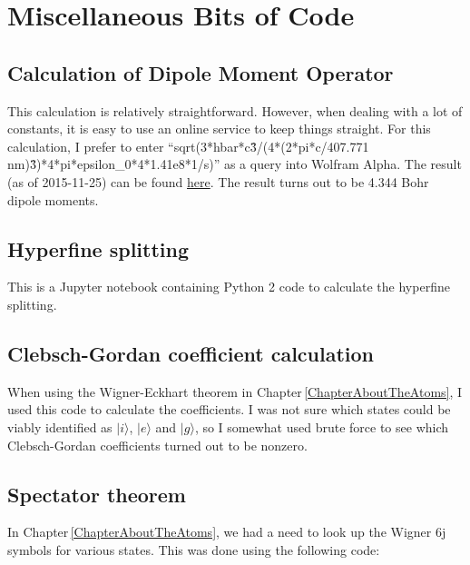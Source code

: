 \chapter{Miscellaneous Bits of Code}
\label{sympy6jAppendix}

\section{Calculation of Dipole Moment Operator}
This calculation is relatively straightforward. However, when dealing with a lot of constants, it is easy to use an online service to keep things straight. For this calculation, I prefer to enter ``sqrt(3*hbar*c\^3/(4*(2*pi*c/407.771 nm)\^3)*4*pi*epsilon\_0*4*1.41e8*1/s)'' as a query into Wolfram Alpha. The result (as of 2015-11-25) can be found 
\href{http://www.wolframalpha.com/input/?i=sqrt%283*hbar*c%5E3%2F%284*%282*pi*c%2F407.771+nm%29%5E3%29*4*pi*epsilon_0*4*1.41e8*1%2Fs%29}{here}.
The result turns out to be 4.344 Bohr dipole moments.
\section{Hyperfine splitting}
This is a Jupyter notebook containing Python 2 code to calculate the hyperfine splitting.

\section{Clebsch-Gordan coefficient calculation}
When using the Wigner-Eckhart theorem in Chapter\,\ref{ChapterAboutTheAtoms}, I used this code to calculate the coefficients. I was not sure which states could be viably identified as $|i\rangle$, $|e\rangle$ and $|g\rangle$, so I somewhat used brute force to see which Clebsch-Gordan coefficients turned out to be nonzero. 

\section{Spectator theorem}
In Chapter\,\ref{ChapterAboutTheAtoms}, we had a need to look up the Wigner 6j symbols for various states. This was done using the following code:

